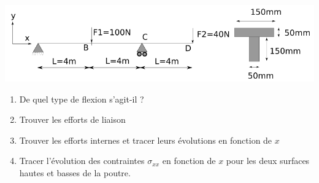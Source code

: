 \documentclass[lecture.tex]{subfiles}
\begin{document}
\exercice{}

\begin{center}
  \includegraphics[scale=0.5]{exo-flexion-poutre-section-T.png}
\end{center}

\begin{enumerate}
  \item De quel type de flexion s’agit-il ?
  \item Trouver les efforts de liaison
  \item Trouver les efforts internes et tracer leurs évolutions en fonction de $x$
  \item Tracer l’évolution des contraintes $\sigma_{xx}$  en  fonction  de  $x$ pour  les  deux  surfaces hautes et basses de la poutre.
\end{enumerate}

\finexercice
\end{document}
